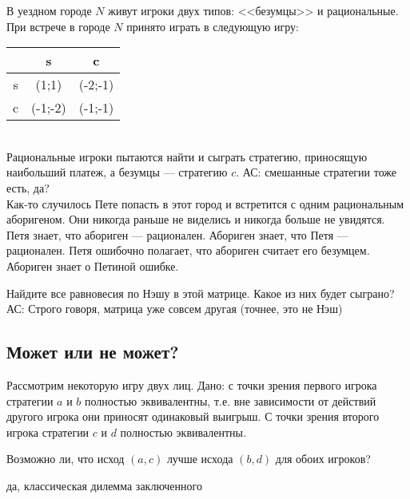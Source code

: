 \begin{problem} 

В уездном городе  $N$  живут игроки двух типов: <<безумцы>> и рациональные. При встрече в городе  $N$  принято играть в следующую игру:\\
\begin{tabular}{|c|c|c|}
			\hline
			& s & c \\
			\hline
			s & (1;1) & (-2;-1) \\
			c & (-1;-2) & (-1;-1) \\
			\hline
\end{tabular} \\
Рациональные игроки пытаются найти и сыграть стратегию, приносящую наибольший платеж, а безумцы --- стратегию  $c$. {\red АС: смешанные стратегии тоже есть, да?}\\ 
Как-то случилось Пете попасть в этот город и встретится с одним рациональным аборигеном. Они никогда раньше не виделись и никогда больше не увидятся. Петя знает, что абориген --- рационален. Абориген знает, что Петя --- рационален. Петя ошибочно полагает, что абориген считает его безумцем. Абориген знает о Петиной ошибке.

Найдите все равновесия по Нэшу в этой матрице. Какое из них будет сыграно?
{\red АС: Строго говоря, матрица уже совсем другая (точнее, это не Нэш)}



\begin{sol}

\end{sol}
\end{problem}



\subsection{Может или не может?}


\begin{problem}
Рассмотрим некоторую игру двух лиц. Дано: с точки зрения первого игрока стратегии $a$ и $b$ полностью
эквивалентны, т.е. вне зависимости от действий другого игрока они
приносят одинаковый выигрыш. С точки зрения второго игрока
стратегии $c$ и $d$ полностью эквивалентны. \par
Возможно ли, что исход $(a,c)$ лучше исхода $(b,d)$ для обоих
игроков?



\begin{sol}
да, классическая дилемма заключенного
\end{sol}
\end{problem}

